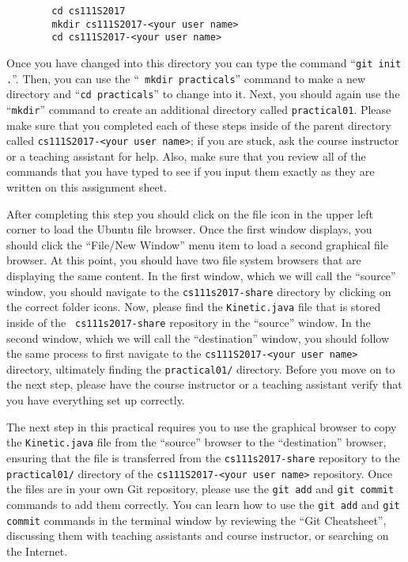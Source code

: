     \vspace*{-.1in}
    \begin{verbatim}
        cd cs111S2017
        mkdir cs111S2017-<your user name>
        cd cs111S2017-<your user name>
    \end{verbatim}
    \vspace*{-.3in}

Once you have changed into this directory you can type the command ``{\tt git init .}''. Then, you can use the ``{\tt
mkdir practicals}'' command to make a new directory and ``{\tt cd practicals}'' to change into it.  Next, you should
again use the ``{\tt mkdir}'' command to create an additional directory called {\tt practical01}.  Please make sure that
you completed each of these steps inside of the parent directory called {\tt cs111S2017-<your user name>}; if you are
stuck, ask the course instructor or a teaching assistant for help. Also, make sure that you review all of the commands
that you have typed to see if you input them exactly as they are written on this assignment sheet.

After completing this step you should click on the file icon in the upper left corner to load the Ubuntu file browser.
Once the first window displays, you should click the ``File/New Window'' menu item to load a second graphical file
browser. At this point, you should have two file system browsers that are displaying the same content.  In the first
window, which we will call the ``source'' window, you should navigate to the {\tt cs111s2017-share} directory by
clicking on the correct folder icons.  Now, please find the {\tt Kinetic.java} file that is stored inside of the {\tt
cs111s2017-share} repository in the ``source'' window. In the second window, which we will call the ``destination''
window, you should follow the same process to first navigate to the {\tt cs111S2017-<your user name>} directory,
ultimately finding the {\tt practical01/} directory. Before you move on to the next step, please have the course
instructor or a teaching assistant verify that you have everything set up correctly.

The next step in this practical requires you to use the graphical browser to copy the {\tt Kinetic.java} file from the
``source'' browser to the ``destination'' browser, ensuring that the file is transferred from the {\tt cs111s2017-share}
repository to the {\tt practical01/} directory of the {\tt cs111S2017-<your user name>} repository.  Once the files are
in your own Git repository, please use the {\tt git add} and {\tt git commit} commands to add them correctly. You can
learn how to use the {\tt git add} and {\tt git commit} commands in the terminal window by reviewing the ``Git
Cheatsheet'', discussing them with teaching assistants and course instructor, or searching on the Internet.

